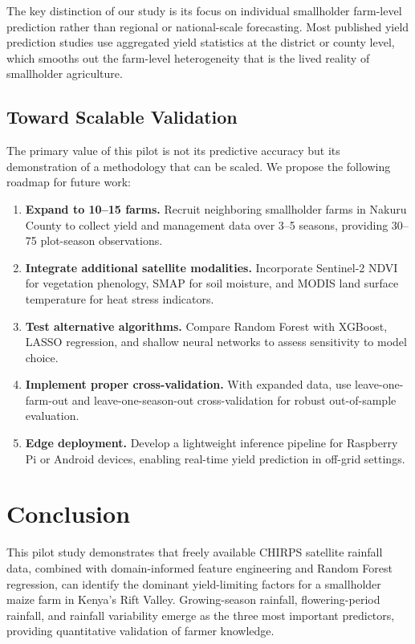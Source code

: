 \documentclass[11pt,a4paper]{article}
\begin{document}
The key distinction of our study is its focus on individual smallholder farm-level prediction rather than regional or national-scale forecasting. Most published yield prediction studies use aggregated yield statistics at the district or county level, which smooths out the farm-level heterogeneity that is the lived reality of smallholder agriculture.

\subsection{Toward Scalable Validation}

The primary value of this pilot is not its predictive accuracy but its demonstration of a methodology that can be scaled. We propose the following roadmap for future work:

\begin{enumerate}[leftmargin=1.5em]
\item \textbf{Expand to 10--15 farms.} Recruit neighboring smallholder farms in Nakuru County to collect yield and management data over 3--5 seasons, providing 30--75 plot-season observations.
\item \textbf{Integrate additional satellite modalities.} Incorporate Sentinel-2 NDVI for vegetation phenology, SMAP for soil moisture, and MODIS land surface temperature for heat stress indicators.
\item \textbf{Test alternative algorithms.} Compare Random Forest with XGBoost, LASSO regression, and shallow neural networks to assess sensitivity to model choice.
\item \textbf{Implement proper cross-validation.} With expanded data, use leave-one-farm-out and leave-one-season-out cross-validation for robust out-of-sample evaluation.
\item \textbf{Edge deployment.} Develop a lightweight inference pipeline for Raspberry Pi or Android devices, enabling real-time yield prediction in off-grid settings.
\end{enumerate}

\section{Conclusion}

This pilot study demonstrates that freely available CHIRPS satellite rainfall data, combined with domain-informed feature engineering and Random Forest regression, can identify the dominant yield-limiting factors for a smallholder maize farm in Kenya's Rift Valley. Growing-season rainfall, flowering-period rainfall, and rainfall variability emerge as the three most important predictors, providing quantitative validation of farmer knowledge.
\end{document}
